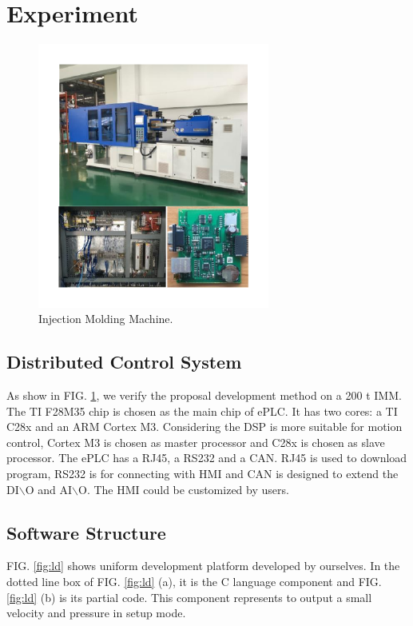 \documentclass[journal,UTF8]{IEEEtran}
\begin{document}
\section{Experiment}
\label{Experiment}

\begin{figure}
	\centering
	\includegraphics[width=3in]{fig/FIG10.pdf}
	\caption{Injection Molding Machine.}
	\label{fig:IMM}
\end{figure}

\subsection{Distributed Control System}
As show in FIG. \ref{fig:IMM}, we verify the proposal development method on a 200 t IMM. The TI F28M35 chip is chosen as the main chip of ePLC. It has two cores: a TI C28x and an ARM Cortex M3. Considering the DSP is more suitable for motion control, Cortex M3 is chosen as master processor and C28x is chosen as slave processor. The ePLC has a RJ45, a RS232 and a CAN. RJ45 is used to download program, RS232 is for connecting with HMI and CAN is designed to extend the DI$\backslash$O and AI$\backslash$O. The HMI could be customized by users.

\subsection{Software Structure}
FIG. \ref{fig:ld} shows uniform development platform developed by ourselves. In the dotted line box of FIG. \ref{fig:ld} (a), it is the C language component and FIG. \ref{fig:ld} (b) is its partial code. This component represents to output a small velocity and pressure in setup mode.
\end{document}
